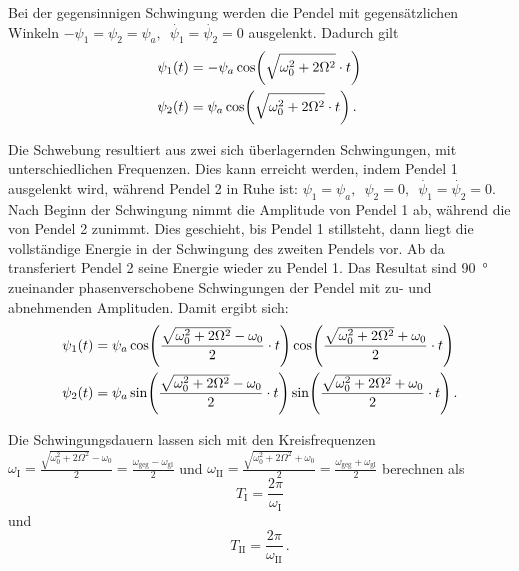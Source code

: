 \documentclass[12pt,a4paper]{scrartcl}
\begin{document}
Bei der gegensinnigen Schwingung werden die Pendel mit gegensätzlichen Winkeln \(-\psi_1 = \psi_2 = \psi_a, \enspace \dot{\psi_1} = \dot{\psi_2} = 0\) ausgelenkt. Dadurch gilt
\begin{align}
	\psi_1(t) &= -\psi_a \cos\mleft(\sqrt{\omega_0^2+2\Omega^2}\cdot t\mright)\\
	\psi_2(t) &= \psi_a \cos\mleft(\sqrt{\omega_0^2+2\Omega^2}\cdot t\mright) \,.
\end{align}

Die Schwebung resultiert aus zwei sich überlagernden Schwingungen, mit unterschiedlichen Frequenzen. Dies kann erreicht werden, indem Pendel 1 ausgelenkt wird, während Pendel 2 in Ruhe ist: \(\psi_1 = \psi_a, \enspace \psi_2 = 0, \enspace \dot{\psi_1} = \dot{\psi_2} = 0\). Nach Beginn der Schwingung nimmt die Amplitude von Pendel 1 ab, während die von Pendel 2 zunimmt. Dies geschieht, bis Pendel 1 stillsteht, dann liegt die vollständige Energie in der Schwingung des zweiten Pendels vor. Ab da transferiert Pendel 2 seine Energie wieder zu Pendel 1. Das Resultat sind \qty{90}{\degree} zueinander phasenverschobene Schwingungen der Pendel mit zu- und abnehmenden Amplituden. Damit ergibt sich:
\begin{align}
	\psi_1(t) &= \psi_a\cos\mleft(\frac{\sqrt{\omega_0^2+2\Omega^2}-\omega_0}{2} \cdot t\mright)\cos\mleft(\frac{\sqrt{\omega_0^2+2\Omega^2}+\omega_0}{2} \cdot t\mright)\\
	\psi_2(t) &= \psi_a\sin\mleft(\frac{\sqrt{\omega_0^2+2\Omega^2}-\omega_0}{2} \cdot t\mright) \sin\mleft(\frac{\sqrt{\omega_0^2+2\Omega^2}+\omega_0}{2} \cdot t\mright) \,.
\end{align}

Die Schwingungsdauern lassen sich mit den Kreisfrequenzen \(\omega_{\text{I}} = \frac{\sqrt{\omega_0^2 + 2\Omega^2} - \omega_0}{2} = \frac{\omega_{\text{geg}} - \omega_{\text{gl}}}{2}\) und \(\omega_{\text{II}} = \frac{\sqrt{\omega_0^2 + 2\Omega^2} + \omega_0}{2} = \frac{\omega_{\text{geg}} + \omega_{\text{gl}}}{2}\) berechnen als
\begin{equation}\label{eq:t1}
	T_{\text{I}} = \frac{2\pi}{\omega_{\text{I}}}
\end{equation}
und
\begin{equation}\label{eq:t2}
	T_{\text{II}} = \frac{2\pi}{\omega_{\text{II}}} \,.
\end{equation}
\end{document}
